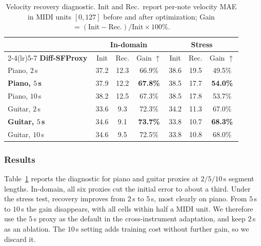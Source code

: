 \documentclass{article}
\begin{document}
\begin{table}[b]
\centering
\small
\renewcommand{\arraystretch}{1.2}
\setlength{\tabcolsep}{5pt}
\begin{tabular}{l||ccc|ccc}
\toprule
& \multicolumn{3}{c}{\textbf{In-domain}} & \multicolumn{3}{c}{\textbf{Stress}} \\
\cmidrule(lr){2-4}\cmidrule(lr){5-7}
\textbf{Diff-SFProxy\,} & Init & Rec. & Gain $\uparrow$ & Init & Rec. & Gain $\uparrow$ \\
\midrule
Piano,  $2$\,s  & 37.2 & 12.3 & 66.9\% & 38.6 & 19.5 & 49.5\% \\
\textbf{Piano,  $5$\,s}  & 37.9 & 12.2 & \textbf{67.8\%} & 38.5 & 17.7 & \textbf{54.0\%} \\
Piano,  $10$\,s & 38.2 & 12.5 & 67.3\% & 38.5 & 17.8 & 53.7\% \\
\midrule
Guitar, $2$\,s  & 33.6 & 9.3 & 72.3\% & 34.2 & 11.3 & 67.0\% \\
\textbf{Guitar, $5$\,s}  & 34.6 &  9.1 & \textbf{73.7\%} & 33.8 & 10.7 & \textbf{68.3\%} \\
Guitar, $10$\,s & 34.6 &  9.5 & 72.5\% & 33.8 & 10.8 & 68.0\% \\
\bottomrule
\end{tabular}
\caption{Velocity recovery diagnostic. Init and Rec.\ report per-note velocity MAE in MIDI units $[0, 127]$ before and after optimization; Gain $= (\text{Init}-\text{Rec.})/\text{Init}\times 100\%$.}
\label{tab:proxy_recovery}
\end{table}

\subsubsection{Results}
Table~\ref{tab:proxy_recovery} reports the diagnostic for piano and guitar proxies at $2/5/10$\,s segment lengths. In-domain, all six proxies cut the initial error to about a third. Under the stress test, recovery improves from $2$\,s to $5$\,s, most clearly on piano. From $5$\,s to $10$\,s the gain disappears, with all cells within half a MIDI unit. We therefore use the $5$\,s proxy as the default in the cross-instrument adaptation, and keep $2$\,s as an ablation. The $10$\,s setting adds training cost without further gain, so we discard it.
\end{document}
